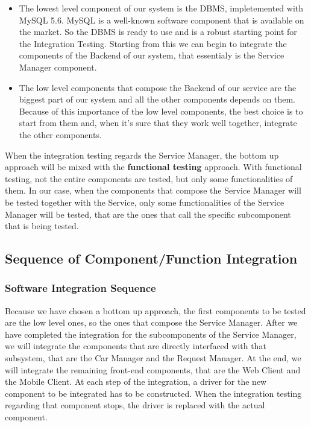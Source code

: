 \begin{itemize}
\item The lowest level component of our system is the DBMS, impletemented with MySQL 5.6. MySQL is a well-known software component that is available on the market. So the DBMS is ready to use and is a robust starting point for the Integration Testing. Starting from this we can begin to integrate the components of the Backend of our system, that essentialy is the Service Manager component. 
\item The low level components that compose the Backend of our service are the biggest part of our system and all the other components depends on them. Because of this importance of the low level components, the best choice is to start from them and, when it's sure that they work well together, integrate the other components.
\end{itemize}  

When the integration testing regards the Service Manager, the bottom up approach will be mixed with the \textbf{functional testing} approach. With functional testing, not the entire components are tested, but only some functionalities of them. In our case, when the components that compose the Service Manager will be tested together with the Service, only some functionalities of the Service Manager will be tested, that are the ones that call the specific subcomponent that is being tested.
\subsection{Sequence of Component/Function Integration} 
\subsubsection{Software Integration Sequence}
Because we have chosen a bottom up approach, the first components to be tested are the low level ones, so the ones that compose the Service Manager. After we have completed the integration for the subcomponents of the Service Manager, we will integrate the components that are directly interfaced with that subsystem, that are the Car Manager and the Request Manager. At the end, we will integrate the remaining front-end components, that are the Web Client and the Mobile Client.
At each step of the integration, a driver for the new component to be integrated has to be constructed. When the integration testing regarding that component stops, the driver is replaced with the actual component.
